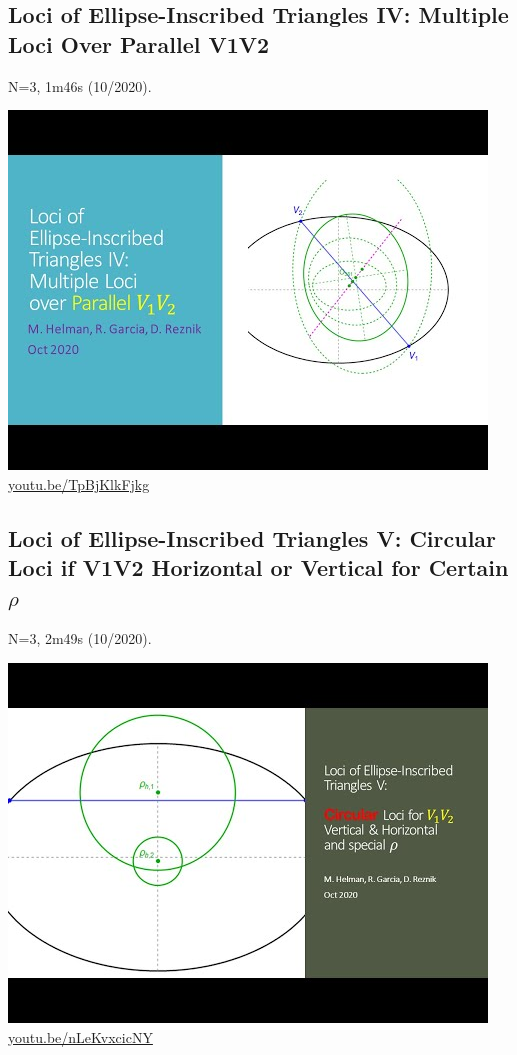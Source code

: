 \documentclass[12pt]{amsart}
\begin{document}
\subsection{Loci of Ellipse-Inscribed Triangles IV: Multiple Loci Over Parallel V1V2}
\label{vid:TpBjKlkFjkg}
\noindent N=3, 1m46s (10/2020). 
\begin{center}\includegraphics[width=.5\textwidth]{pics/TpBjKlkFjkg.jpg} \\ 
\href{https://youtu.be/TpBjKlkFjkg}{\url{youtu.be/TpBjKlkFjkg}}\end{center}
% 

\subsection{Loci of Ellipse-Inscribed Triangles V: Circular Loci if V1V2 Horizontal or Vertical for Certain $\rho$}
\label{vid:nLeKvxcicNY}
\noindent N=3, 2m49s (10/2020). 
\begin{center}\includegraphics[width=.5\textwidth]{pics/nLeKvxcicNY.jpg} \\ 
\href{https://youtu.be/nLeKvxcicNY}{\url{youtu.be/nLeKvxcicNY}}\end{center}
% 
\end{document}
